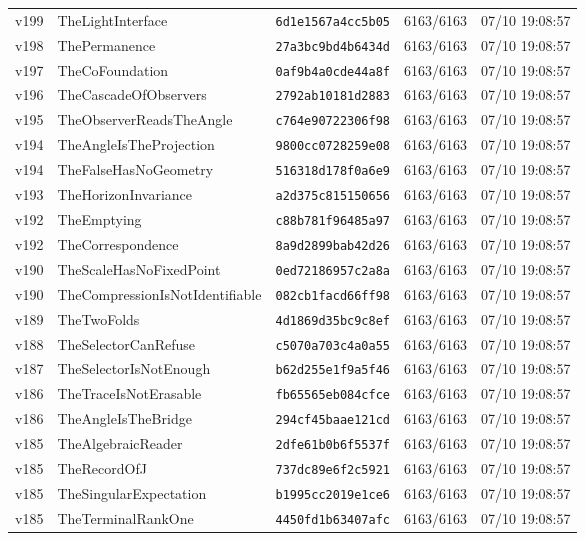 \documentclass[11pt]{article}
\theoremstyle{definition}\newtheorem{deriv}{Derivation}
\begin{document}
{\begin{longtable}{@{}lllll@{}}
v199 & TheLightInterface & \texttt{6d1e1567a4cc5b05} & 6163/6163 & 07/10 19:08:57 \\
v198 & ThePermanence & \texttt{27a3bc9bd4b6434d} & 6163/6163 & 07/10 19:08:57 \\
v197 & TheCoFoundation & \texttt{0af9b4a0cde44a8f} & 6163/6163 & 07/10 19:08:57 \\
v196 & TheCascadeOfObservers & \texttt{2792ab10181d2883} & 6163/6163 & 07/10 19:08:57 \\
v195 & TheObserverReadsTheAngle & \texttt{c764e90722306f98} & 6163/6163 & 07/10 19:08:57 \\
v194 & TheAngleIsTheProjection & \texttt{9800cc0728259e08} & 6163/6163 & 07/10 19:08:57 \\
v194 & TheFalseHasNoGeometry & \texttt{516318d178f0a6e9} & 6163/6163 & 07/10 19:08:57 \\
v193 & TheHorizonInvariance & \texttt{a2d375c815150656} & 6163/6163 & 07/10 19:08:57 \\
v192 & TheEmptying & \texttt{c88b781f96485a97} & 6163/6163 & 07/10 19:08:57 \\
v192 & TheCorrespondence & \texttt{8a9d2899bab42d26} & 6163/6163 & 07/10 19:08:57 \\
v190 & TheScaleHasNoFixedPoint & \texttt{0ed72186957c2a8a} & 6163/6163 & 07/10 19:08:57 \\
v190 & TheCompressionIsNotIdentifiable & \texttt{082cb1facd66ff98} & 6163/6163 & 07/10 19:08:57 \\
v189 & TheTwoFolds & \texttt{4d1869d35bc9c8ef} & 6163/6163 & 07/10 19:08:57 \\
v188 & TheSelectorCanRefuse & \texttt{c5070a703c4a0a55} & 6163/6163 & 07/10 19:08:57 \\
v187 & TheSelectorIsNotEnough & \texttt{b62d255e1f9a5f46} & 6163/6163 & 07/10 19:08:57 \\
v186 & TheTraceIsNotErasable & \texttt{fb65565eb084cfce} & 6163/6163 & 07/10 19:08:57 \\
v186 & TheAngleIsTheBridge & \texttt{294cf45baae121cd} & 6163/6163 & 07/10 19:08:57 \\
v185 & TheAlgebraicReader & \texttt{2dfe61b0b6f5537f} & 6163/6163 & 07/10 19:08:57 \\
v185 & TheRecordOfJ & \texttt{737dc89e6f2c5921} & 6163/6163 & 07/10 19:08:57 \\
v185 & TheSingularExpectation & \texttt{b1995cc2019e1ce6} & 6163/6163 & 07/10 19:08:57 \\
v185 & TheTerminalRankOne & \texttt{4450fd1b63407afc} & 6163/6163 & 07/10 19:08:57 \\

\end{longtable}}
\end{document}
